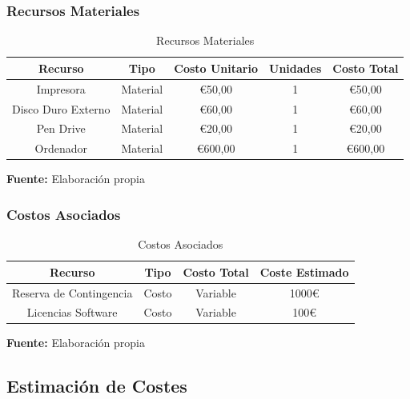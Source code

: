 \documentclass[a4paper, 10pt]{article}
\begin{document}
\subsubsection{Recursos Materiales}
\begin{table}[H]
\caption{Recursos Materiales}
\centering
\renewcommand{\arraystretch}{1.5}
\begin{tabular}{|c|c|c|c|c|}
\hline
\textbf{Recurso} & \textbf{Tipo} & \textbf{Costo Unitario} & \textbf{Unidades} & \textbf{Costo Total}  \\ \hline
Impresora & Material & €50,00 & 1& €50,00  \\ \hline
Disco Duro Externo & Material &  €60,00 &1& €60,00  \\ \hline
Pen Drive & Material & €20,00 & 1& €20,00  \\ \hline
Ordenador & Material & €600,00 & 1& €600,00  \\ \hline
\end{tabular}
\begin{flushleft}\centering
    \footnotesize \textbf{Fuente:} Elaboración propia
\end{flushleft}   
\label{tab:recursos_materiales}
\end{table}



\subsubsection{Costos Asociados}

\begin{table}[H]
\caption{Costos Asociados}
\centering
\renewcommand{\arraystretch}{1.5}
\begin{tabular}{|c|c|c|c|}
\hline
\textbf{Recurso} & \textbf{Tipo} & \textbf{Costo Total} & \textbf{Coste Estimado}  \\ \hline
Reserva de Contingencia & Costo & Variable & 1000€  \\ \hline
Licencias Software & Costo & Variable &  100€ \\ \hline
\end{tabular}
\begin{flushleft}\centering
    \footnotesize \textbf{Fuente:} Elaboración propia
\end{flushleft}   
\label{tab:costos_asociados}
\end{table}



\subsection{Estimación de Costes}
\end{document}
